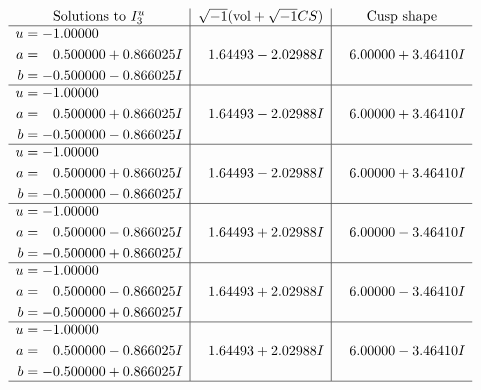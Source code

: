 \documentclass[1p]{elsarticle_modified}
\theoremstyle{definition}
\newcommand{\I}{\sqrt{-1}}
\begin{document}
$$\begin{array}{c|c|c}  
\text{Solutions to }I^u_{3}& \I (\text{vol} + \sqrt{-1}CS) & \text{Cusp shape}\\
 \hline 
\begin{aligned}
u &= -1.00000\phantom{ +0.000000I} \\
a &= \phantom{-}0.500000 + 0.866025 I \\
b &= -0.500000 - 0.866025 I\end{aligned}
 & \phantom{-}1.64493 - 2.02988 I & \phantom{-}6.00000 + 3.46410 I \\ \hline\begin{aligned}
u &= -1.00000\phantom{ +0.000000I} \\
a &= \phantom{-}0.500000 + 0.866025 I \\
b &= -0.500000 - 0.866025 I\end{aligned}
 & \phantom{-}1.64493 - 2.02988 I & \phantom{-}6.00000 + 3.46410 I \\ \hline\begin{aligned}
u &= -1.00000\phantom{ +0.000000I} \\
a &= \phantom{-}0.500000 + 0.866025 I \\
b &= -0.500000 - 0.866025 I\end{aligned}
 & \phantom{-}1.64493 - 2.02988 I & \phantom{-}6.00000 + 3.46410 I \\ \hline\begin{aligned}
u &= -1.00000\phantom{ +0.000000I} \\
a &= \phantom{-}0.500000 - 0.866025 I \\
b &= -0.500000 + 0.866025 I\end{aligned}
 & \phantom{-}1.64493 + 2.02988 I & \phantom{-}6.00000 - 3.46410 I \\ \hline\begin{aligned}
u &= -1.00000\phantom{ +0.000000I} \\
a &= \phantom{-}0.500000 - 0.866025 I \\
b &= -0.500000 + 0.866025 I\end{aligned}
 & \phantom{-}1.64493 + 2.02988 I & \phantom{-}6.00000 - 3.46410 I \\ \hline\begin{aligned}
u &= -1.00000\phantom{ +0.000000I} \\
a &= \phantom{-}0.500000 - 0.866025 I \\
b &= -0.500000 + 0.866025 I\end{aligned}
 & \phantom{-}1.64493 + 2.02988 I & \phantom{-}6.00000 - 3.46410 I\\
 \hline 
 \end{array}$$\newpage
\end{document}
